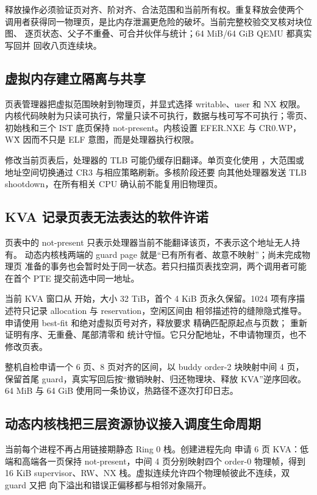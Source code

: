 释放操作必须验证页对齐、阶对齐、合法范围和当前所有权。重复释放会使两个
调用者获得同一物理页，是比内存泄漏更危险的破坏。当前完整校验交叉核对块位图、
逐页状态、父子不重叠、可合并伙伴与统计；64 MiB/64 GiB QEMU 都真实写回并
回收八页连续块。

\subsection{虚拟内存建立隔离与共享}

页表管理器把虚拟范围映射到物理页，并显式选择 writable、user 和 NX 权限。
内核代码映射为只读可执行，常量只读不可执行，数据与栈可写不可执行；零页、
初始栈和三个 IST 底页保持 not-present。内核设置 EFER.NXE 与 CR0.WP，
W\^X 因而不只是 ELF 意图，而是处理器执行权限。

修改当前页表后，处理器的 TLB 可能仍缓存旧翻译。单页变化使用
，大范围或地址空间切换通过 CR3 与相应策略刷新。多核阶段还要
向其他处理器发送 TLB shootdown，在所有相关 CPU 确认前不能复用旧物理页。

\subsection{KVA 记录页表无法表达的软件许诺}

页表中的 not-present 只表示处理器当前不能翻译该页，不表示这个地址无人持有。
动态内核栈两端的 guard page 就是“已有所有者、故意不映射”；尚未完成物理页
准备的事务也会暂时处于同一状态。若只扫描页表找空洞，两个调用者可能在首个
PTE 提交前选中同一地址。

当前 KVA 窗口从  开始，大小 32 TiB，首个 4 KiB
页永久保留。1024 项有序描述符只记录 allocation 与 reservation，空闲区间由
相邻描述符的缝隙隐式推导。申请使用 best-fit 和绝对虚拟页号对齐，释放要求
精确匹配原起点与页数； 重新证明有序、无重叠、尾部清零和
统计守恒。它只分配地址，不申请物理页，也不修改页表。

整机自检申请一个 6 页、8 页对齐的区间，以 buddy order-2 块映射中间 4 页，
保留首尾 guard，真实写回后按“撤销映射、归还物理块、释放 KVA”逆序回收。
64 MiB 与 64 GiB 使用同一条协议，热路径不逐次打印日志。

\subsection{动态内核栈把三层资源协议接入调度生命周期}

当前每个进程不再占用链接期静态 Ring 0 栈。创建进程先向
 申请 6 页 KVA：低端和高端各一页保持
not-present，中间 4 页分别映射四个 order-0 物理帧，得到 16 KiB
supervisor、RW、NX 栈。虚拟连续允许四个物理帧彼此不连续，双 guard 又把
向下溢出和错误正偏移都与相邻对象隔开。

